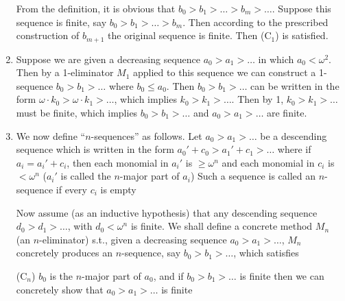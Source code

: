 \documentclass[11pt]{article}
\begin{document}
\begin{enumerate}
From the definition, it is obvious that \(b_0>b_1>\dots>b_m>\dots\). Suppose this sequence is
finite, say \(b_0>b_1>\dots>b_m\). Then according to the prescribed construction
of \(b_{m+1}\) the original sequence is finite. Then (\(\text{C}_1\)) is satisfied.
\item Suppose we are given a decreasing sequence \(a_0>a_1>\dots\) in which \(a_0<\omega^2\). Then by a
1-eliminator \(M_1\) applied to this sequence we can construct a 1-sequence \(b_0>b_1>\dots\)
where \(b_0\le a_0\). Then \(b_0>b_1>\dots\) can be written in the
form \(\omega\cdot k_0>\omega\cdot k_1>\dots\), which implies \(k_0>k_1>\dots\). Then by
1, \(k_0>k_1>\dots\) must be finite, which implies \(b_0>b_1>\dots\) and \(a_0>a_1>\dots\) are finite.
\item We now define ``\(n\)-sequences'' as follows. Let \(a_0>a_1>\dots\) be a descending sequence
which is written in the form \(a_0'+c_0>a_1' +c_1>\dots\) where if \(a_i=a_i'+c_i\), then
each monomial in \(a_i'\) is \(\ge\omega^n\) and each monomial in \(c_i\) is \(<\omega^n\)
(\(a_i'\) is called the \(n\)-major part of \(a_i\)) Such a sequence is called
an \(n\)-sequence if every \(c_i\) is empty

Now assume (as an inductive hypothesis) that any descending sequence \(d_0>d_1>\dots\),
with \(d_0<\omega^n\) is finite. We shall define a concrete method \(M_n\) (an \(n\)-eliminator)
s.t., given a decreasing sequence \(a_0>a_1>\dots\), \(M_n\) concretely produces
an \(n\)-sequence, say \(b_0>b_1>\dots\), which satisfies

\begin{center}
(\(\text{C}_n\)) \(b_0\) is the \(n\)-major part of \(a_0\), and if \(b_0>b_1>\dots\) is
finite then we can concretely show that \(a_0>a_1>\dots\) is finite
\end{center}


\end{enumerate}
\end{document}
